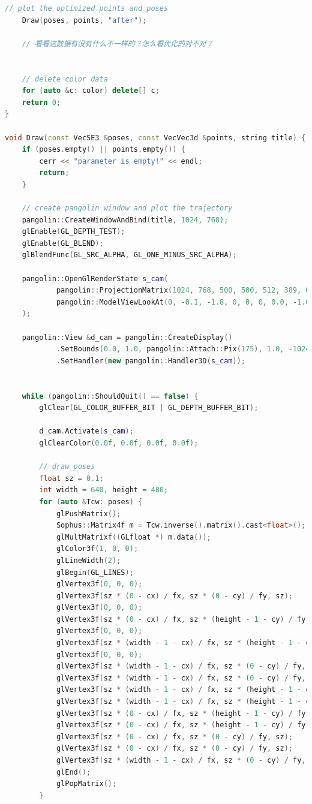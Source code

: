 \documentclass[40pt,a4paper，UTF8]{ctexart}
\numberwithin{equation}{section}
\begin{document}
\begin{lstlisting}[language=C++, caption=Direct\_BA.cpp]
    // plot the optimized points and poses
    Draw(poses, points, "after");

    // 看看这数据有没有什么不一样的？怎么看优化的对不对？


    // delete color data
    for (auto &c: color) delete[] c;
    return 0;
}

void Draw(const VecSE3 &poses, const VecVec3d &points, string title) {
    if (poses.empty() || points.empty()) {
        cerr << "parameter is empty!" << endl;
        return;
    }

    // create pangolin window and plot the trajectory
    pangolin::CreateWindowAndBind(title, 1024, 768);
    glEnable(GL_DEPTH_TEST);
    glEnable(GL_BLEND);
    glBlendFunc(GL_SRC_ALPHA, GL_ONE_MINUS_SRC_ALPHA);

    pangolin::OpenGlRenderState s_cam(
            pangolin::ProjectionMatrix(1024, 768, 500, 500, 512, 389, 0.1, 1000),
            pangolin::ModelViewLookAt(0, -0.1, -1.8, 0, 0, 0, 0.0, -1.0, 0.0)
    );

    pangolin::View &d_cam = pangolin::CreateDisplay()
            .SetBounds(0.0, 1.0, pangolin::Attach::Pix(175), 1.0, -1024.0f / 768.0f)
            .SetHandler(new pangolin::Handler3D(s_cam));


    while (pangolin::ShouldQuit() == false) {
        glClear(GL_COLOR_BUFFER_BIT | GL_DEPTH_BUFFER_BIT);

        d_cam.Activate(s_cam);
        glClearColor(0.0f, 0.0f, 0.0f, 0.0f);

        // draw poses
        float sz = 0.1;
        int width = 640, height = 480;
        for (auto &Tcw: poses) {
            glPushMatrix();
            Sophus::Matrix4f m = Tcw.inverse().matrix().cast<float>();
            glMultMatrixf((GLfloat *) m.data());
            glColor3f(1, 0, 0);
            glLineWidth(2);
            glBegin(GL_LINES);
            glVertex3f(0, 0, 0);
            glVertex3f(sz * (0 - cx) / fx, sz * (0 - cy) / fy, sz);
            glVertex3f(0, 0, 0);
            glVertex3f(sz * (0 - cx) / fx, sz * (height - 1 - cy) / fy, sz);
            glVertex3f(0, 0, 0);
            glVertex3f(sz * (width - 1 - cx) / fx, sz * (height - 1 - cy) / fy, sz);
            glVertex3f(0, 0, 0);
            glVertex3f(sz * (width - 1 - cx) / fx, sz * (0 - cy) / fy, sz);
            glVertex3f(sz * (width - 1 - cx) / fx, sz * (0 - cy) / fy, sz);
            glVertex3f(sz * (width - 1 - cx) / fx, sz * (height - 1 - cy) / fy, sz);
            glVertex3f(sz * (width - 1 - cx) / fx, sz * (height - 1 - cy) / fy, sz);
            glVertex3f(sz * (0 - cx) / fx, sz * (height - 1 - cy) / fy, sz);
            glVertex3f(sz * (0 - cx) / fx, sz * (height - 1 - cy) / fy, sz);
            glVertex3f(sz * (0 - cx) / fx, sz * (0 - cy) / fy, sz);
            glVertex3f(sz * (0 - cx) / fx, sz * (0 - cy) / fy, sz);
            glVertex3f(sz * (width - 1 - cx) / fx, sz * (0 - cy) / fy, sz);
            glEnd();
            glPopMatrix();
        }


\end{lstlisting}
\end{document}
